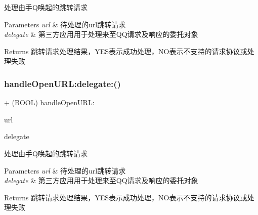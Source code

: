 处理由手\+Q唤起的跳转请求 
\begin{DoxyParams}{Parameters}
{\em url} & 待处理的url跳转请求 \\
\hline
{\em delegate} & 第三方应用用于处理来至\+Q\+Q请求及响应的委托对象 \\
\hline
\end{DoxyParams}
\begin{DoxyReturn}{Returns}
跳转请求处理结果，\+Y\+E\+S表示成功处理，\+N\+O表示不支持的请求协议或处理失败 
\end{DoxyReturn}
\mbox{\label{interface_q_q_api_interface_abb9f4ae5999f13ee71aece0f58043b84}} 
\subsubsection{\texorpdfstring{handle\+Open\+U\+R\+L\+:delegate\+:()}{handleOpenURL:delegate:()}\hspace{0.1cm}{\footnotesize\ttfamily [2/2]}}
{\footnotesize\ttfamily + (B\+O\+OL) handle\+Open\+U\+R\+L\+: \begin{DoxyParamCaption}\item[{(N\+S\+U\+RL $\ast$)}]{url }\item[{delegate:(id$<$ Q\+Q\+Api\+Interface\+Delegate $>$)}]{delegate }\end{DoxyParamCaption}}

处理由手\+Q唤起的跳转请求 
\begin{DoxyParams}{Parameters}
{\em url} & 待处理的url跳转请求 \\
\hline
{\em delegate} & 第三方应用用于处理来至\+Q\+Q请求及响应的委托对象 \\
\hline
\end{DoxyParams}
\begin{DoxyReturn}{Returns}
跳转请求处理结果，\+Y\+E\+S表示成功处理，\+N\+O表示不支持的请求协议或处理失败 
\end{DoxyReturn}
\mbox{\label{interface_q_q_api_interface_a3cce7811084fbe0fac86a61068a5bb8f}} 

